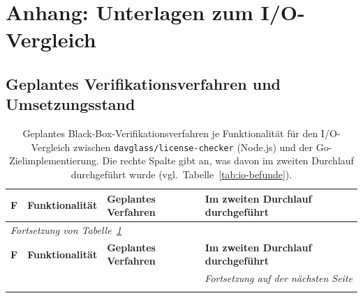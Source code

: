\clearpage
\renewcommand{\thesection}{\Alph{section}}
\setcounter{section}{0}

\section{Anhang: Unterlagen zum I/O-Vergleich} \label{anhang}

\subsection{Geplantes Verifikationsverfahren und Umsetzungsstand} \label{anhang:plan}

\begin{small}
\begin{longtable}{|p{0.7cm}|p{2.6cm}|p{7.4cm}|p{3.4cm}|}
\caption{Geplantes Black-Box-Verifikationsverfahren je Funktionalität für den I/O-Vergleich zwischen \texttt{davglass/license-checker} (Node.js) und der Go-Zielimplementierung. Die rechte Spalte gibt an, was davon im zweiten Durchlauf durchgeführt wurde (vgl.\ Tabelle~\ref{tab:io-befunde}).} \label{tab:io-vergleich} \\
\hline
\textbf{F} & \textbf{Funktionalität} & \textbf{Geplantes Verfahren} & \textbf{Im zweiten Durchlauf durchgeführt} \\
\hline
\endfirsthead

\multicolumn{4}{l}{\textit{Fortsetzung von Tabelle~\ref{tab:io-vergleich}}} \\
\hline
\textbf{F} & \textbf{Funktionalität} & \textbf{Geplantes Verfahren} & \textbf{Im zweiten Durchlauf durchgeführt} \\
\hline
\endhead

\hline
\multicolumn{4}{r}{\textit{Fortsetzung auf der nächsten Seite}} \\
\endfoot

\hline
\endlastfoot


\end{longtable}
\end{small}
